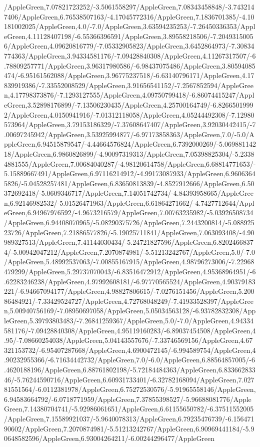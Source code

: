{\begin{tikzternal}
/AppleGreen,7.07821723252/-3.5061558297/AppleGreen,7.08343458848/-3.7432147406/AppleGreen,6.76538507163/-4.17045772316/AppleGreen,7.1836701385/-4.10181002025/AppleGreen,4.0/-7.0/AppleGreen,3.63594235253/-7.26450336353/AppleGreen,4.11128407198/-6.55366396591/AppleGreen,3.89558218506/-7.20493150056/AppleGreen,4.09620816779/-7.05332905823/AppleGreen,3.6452864973/-7.30834774363/AppleGreen,3.94334581176/-7.09428840308/AppleGreen,4.11267317507/-6.78809257771/AppleGreen,3.96317980586/-6.98437075486/AppleGreen,3.80594085474/-6.95161562088/AppleGreen,3.96775237518/-6.63140796171/AppleGreen,4.17839919386/-7.33552008529/AppleGreen,3.91656541152/-7.2567852594/AppleGreen,4.17798373876/-7.1293127555/AppleGreen,4.09750799418/-6.86074415247/AppleGreen,3.52898176899/-7.13506230435/AppleGreen,4.25700164749/-6.82665019992/AppleGreen,4.0150941916/-7.01312118058/AppleGreen,4.05244492308/-7.12980573964/AppleGreen,3.79153186329/-7.37608647407/AppleGreen,3.92030442415/-7.00697245942/AppleGreen,3.53925994877/-6.97173858363/AppleGreen,7.0/-5.0/AppleGreen,6.94515879547/-4.44664576824/AppleGreen,6.7392000269/-5.06988114218/AppleGreen,6.9860826899/-4.90097319313/AppleGreen,7.05398825304/-5.23384881555/AppleGreen,7.00684040287/-4.98120614758/AppleGreen,6.68814771653/-5.15889667491/AppleGreen,6.97116214912/-4.99173087933/AppleGreen,6.96063645826/-5.04528257481/AppleGreen,6.83650813839/-4.8527912666/AppleGreen,6.50372692418/-5.0609346717/AppleGreen,7.14051742734/-4.84393958665/AppleGreen,6.92146982532/-5.01526471963/AppleGreen,6.61864271662/-4.7427712644/AppleGreen,6.94967976592/-4.9673216579/AppleGreen,7.00763235982/-5.03926508734/AppleGreen,6.94408070965/-5.08290375726/AppleGreen,7.2443200814/-5.08892523726/AppleGreen,7.21886577826/-5.19025711841/AppleGreen,7.063093408/-4.90989327513/AppleGreen,7.41144030434/-5.24721827596/AppleGreen,6.82024668374/-5.00942047212/AppleGreen,7.2070874981/-5.51213242767/AppleGreen,5.0/-7.0/AppleGreen,5.48992537063/-7.00855167915/AppleGreen,4.98796273006/-7.22968479299/AppleGreen,5.29737070043/-6.83516472912/AppleGreen,4.95368964951/-6.62283246238/AppleGreen,4.97992608181/-6.97770565524/AppleGreen,4.90379183221/-6.94667094177/AppleGreen,4.98827806615/-7.0276151456/AppleGreen,5.20086484921/-7.33429524727/AppleGreen,4.72768048249/-7.41933528397/AppleGreen,5.00940756169/-7.08950697058/AppleGreen,5.05034563128/-6.93782832308/AppleGreen,5.39793803483/-7.26841259367/AppleGreen,5.0/-7.0/AppleGreen,4.94334581176/-7.09428840308/AppleGreen,4.95119160283/-6.89037454508/AppleGreen,4.95/-7.08660254038/AppleGreen,5.04143557676/-7.33746569156/AppleGreen,4.67321153732/-6.95407287668/AppleGreen,4.6900472145/-6.994589754/AppleGreen,4.90232955366/-6.71634442732/AppleGreen,7.0/-6.0/AppleGreen,6.88564857005/-6.4620188196/AppleGreen,6.88761802198/-5.72184484363/AppleGreen,6.83366283346/-5.76244590716/AppleGreen,6.60931733401/-6.32782168094/AppleGreen,7.02781551564/-6.0112381978/AppleGreen,6.75272530576/-5.91965558146/AppleGreen,6.94583664792/-6.0718771959/AppleGreen,7.37855398527/-5.96688081776/AppleGreen,7.14380704741/-5.92986061651/AppleGreen,6.61155650782/-6.37511552005/AppleGreen,7.15589921037/-5.9640078313/AppleGreen,6.79235476739/-6.15647190602/AppleGreen,7.2070874981/-5.51213242767/AppleGreen,6.90969441184/-5.90648582596/AppleGreen,6.93004264211/-6.00244296477/AppleGreen
\end{tikzternal}}
